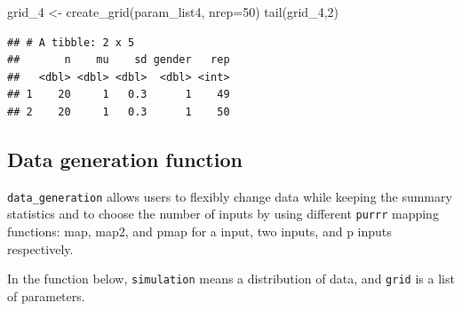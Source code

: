 \documentclass[11pt,a4paper]{article}
\newenvironment{Shaded}{\begin{snugshade}}{\end{snugshade}}
\newcommand{\AttributeTok}[1]{\textcolor[rgb]{0.77,0.63,0.00}{#1}}
\newcommand{\DecValTok}[1]{\textcolor[rgb]{0.00,0.00,0.81}{#1}}
\newcommand{\FunctionTok}[1]{\textcolor[rgb]{0.00,0.00,0.00}{#1}}
\newcommand{\NormalTok}[1]{#1}
\newcommand{\OtherTok}[1]{\textcolor[rgb]{0.56,0.35,0.01}{#1}}
\begin{document}
\begin{Shaded}
\begin{Highlighting}[]
\NormalTok{grid\_4 }\OtherTok{\textless{}{-}} \FunctionTok{create\_grid}\NormalTok{(param\_list4, }\AttributeTok{nrep=}\DecValTok{50}\NormalTok{)}
\FunctionTok{tail}\NormalTok{(grid\_4,}\DecValTok{2}\NormalTok{)}
\end{Highlighting}
\end{Shaded}

\begin{verbatim}
## # A tibble: 2 x 5
##       n    mu    sd gender   rep
##   <dbl> <dbl> <dbl>  <dbl> <int>
## 1    20     1   0.3      1    49
## 2    20     1   0.3      1    50
\end{verbatim}

\hypertarget{data-generation-function}{%
\subsection{Data generation function}\label{data-generation-function}}

\texttt{data\_generation} allows users to flexibly change data while
keeping the summary statistics and to choose the number of inputs by
using different \texttt{purrr} mapping functions: map, map2, and pmap
for a input, two inputs, and p inputs respectively.

In the function below, \texttt{simulation} means a distribution of data,
and \texttt{grid} is a list of parameters.
\end{document}
